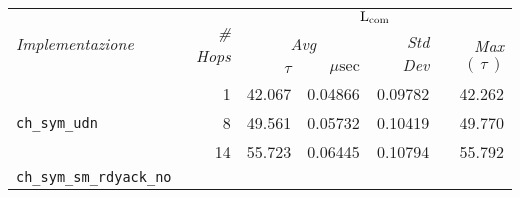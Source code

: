 \begin{table}[!b]
  \centering
  \begin{subtable}[b]{\textwidth}
    \centering
    \begin{tabular}{|l|r|r|r|r|r|}
      \hline
      \multirow{3}{*}{\emph{Implementazione}} &
      \multirow{3}{4ex}{\emph{\# Hops}} &
      \multicolumn{4}{|c|}{$\mathrm{L}_{\mathrm{com}}$} \\
      \cline{3-6}
      & & \multicolumn{2}{|c|}{\emph{Avg}} &
      \multirow{2}{*}{\emph{Std Dev}} &
      \multirow{2}{*}{\emph{Max} $(\,\tau\,)$} \\
      \cline{3-4}
      & & $\tau$ & $\mu\mathrm{sec}$ & & \\
      \hline
      \multirow{3}{*}{\texttt{ch\_sym\_udn}} 
      & 1 & 42.067 & 0.04866 & 0.09782 & 42.262 \\
      & 8 & 49.561 & 0.05732 & 0.10419 & 49.770 \\
      & 14 & 55.723 & 0.06445 & 0.10794 & 55.792 \\
      \hline
      \multirow{3}{*}{\texttt{ch\_sym\_sm\_rdyack\_no}} 

\end{tabular}
\end{subtable}
\end{table}
